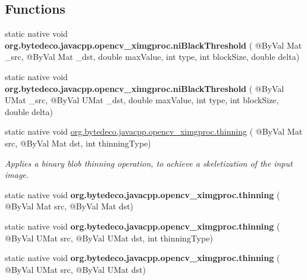 \subsection*{Functions}
\begin{DoxyCompactItemize}
\item 
\mbox{\label{group__ximgproc_ga896900e0389a57c36db289c6781c9f6d}} 
static native void {\bfseries org.\+bytedeco.\+javacpp.\+opencv\+\_\+ximgproc.\+ni\+Black\+Threshold} ( @By\+Val Mat \+\_\+src, @By\+Val Mat \+\_\+dst, double max\+Value, int type, int block\+Size, double delta)
\item 
\mbox{\label{group__ximgproc_ga19e293a3db574f9ca153f88f0e50288e}} 
static native void {\bfseries org.\+bytedeco.\+javacpp.\+opencv\+\_\+ximgproc.\+ni\+Black\+Threshold} ( @By\+Val U\+Mat \+\_\+src, @By\+Val U\+Mat \+\_\+dst, double max\+Value, int type, int block\+Size, double delta)
\item 
static native void \hyperlink{group__ximgproc_gaf281201400d757cb4921c49dcf729896}{org.\+bytedeco.\+javacpp.\+opencv\+\_\+ximgproc.\+thinning} ( @By\+Val Mat src, @By\+Val Mat dst, int thinning\+Type)
\begin{DoxyCompactList}\small\item\em Applies a binary blob thinning operation, to achieve a skeletization of the input image. \end{DoxyCompactList}\item 
\mbox{\label{group__ximgproc_ga09fa09699c3497fffdf0ac75bd52c377}} 
static native void {\bfseries org.\+bytedeco.\+javacpp.\+opencv\+\_\+ximgproc.\+thinning} ( @By\+Val Mat src, @By\+Val Mat dst)
\item 
\mbox{\label{group__ximgproc_ga32ef27b55fd43c1171ff306a950b9547}} 
static native void {\bfseries org.\+bytedeco.\+javacpp.\+opencv\+\_\+ximgproc.\+thinning} ( @By\+Val U\+Mat src, @By\+Val U\+Mat dst, int thinning\+Type)
\item 
\mbox{\label{group__ximgproc_ga530e082dfa5fdd4df5a397a75874241c}} 
static native void {\bfseries org.\+bytedeco.\+javacpp.\+opencv\+\_\+ximgproc.\+thinning} ( @By\+Val U\+Mat src, @By\+Val U\+Mat dst)
\end{DoxyCompactItemize}


